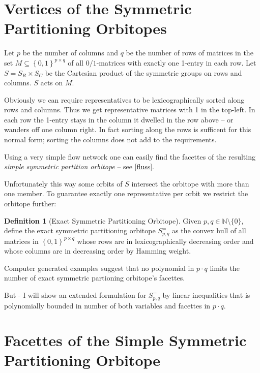\documentclass{amsart}
\theoremstyle{definition}
\newtheorem{defn}{Definition}
\begin{document}
\section{Vertices of the Symmetric Partitioning Orbitopes}
Let $p$ be the number of columns and $q$ be the number of rows of
matrices in the set \(M \subseteq \left\{0,1\right\}^{p\times q}\) of all
$0/1$-matrices with exactly one 1-entry in each row.  Let \(S = S_R
\times S_C\) be the Cartesian product of the symmetric groups on rows
and columns.  \(S\) acts on \(M\).


Obviously we can require representatives to be lexicographically
sorted along rows and columns.  Thus we get representative matrices
with 1 in the top-left.  In each row the 1-entry stays in the column
it dwelled in the row above -- or wanders off one column right.  In
fact sorting along the rows is sufficent for this normal form; sorting
the columns does not add to the requirements.

Using a very simple flow network one can easily find the facettes of
the resulting \textit{simple symmetric partition orbitope} -- see
\ref{fluss}.


Unfortunately this way some orbits of $S$ intersect the orbitope with
more than one member.  To guarantee exactly one representative per
orbit we restrict the orbitope further:

\begin{defn}[Exact Symmetric Partitioning Orbitope]
  \label{espo}
  Given \(p, q \in \mathbb{N} \setminus \{0\}\), define the exact
  symmetric partitioning orbitope \(S^=_{p,q}\) as the convex hull of
  all matrices in \(\left\{0,1\right\}^{p\times q}\) whose rows are in
  lexicographically decreasing order and whose columns are in
  decreasing order by Hamming weight.
\end{defn}

Computer generated examples suggest that no polynomial in \(p \cdot
q\) limits the number of exact symmetric partioning orbitope's
facettes.

But - I will show an extended formulation for \(S^=_{p,q}\) by linear
inequalities that is polynomially bounded in number of both variables
and facettes in \(p \cdot q\).


\section{Facettes of the Simple Symmetric Partitioning Orbitope}
\end{document}
